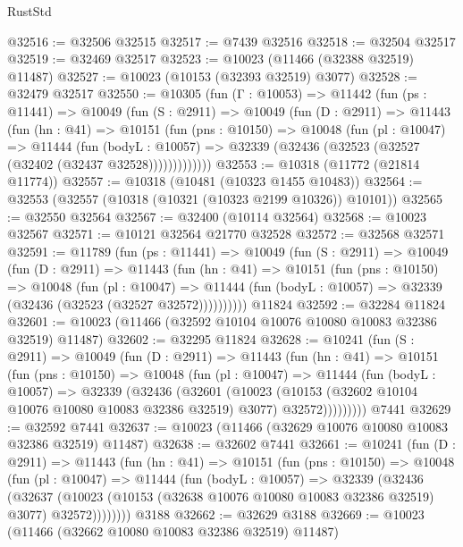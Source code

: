 \begin{lexlean}{RustStd}
\begin{coremodule}
@32516 := @32506 @32515
@32517 := @7439 @32516
@32518 := @32504 @32517
@32519 := @32469 @32517
@32523 := @10023 (@11466 (@32388 @32519) @11487)
@32527 := @10023 (@10153 (@32393 @32519) @3077)
@32528 := @32479 @32517
@32550 := @10305
    (fun (Γ : @10053) =>
    @11442
      (fun (ps : @11441) =>
      @10049
        (fun (S : @2911) =>
        @10049
          (fun (D : @2911) =>
          @11443
            (fun (hn : @41) =>
            @10151
              (fun (pns : @10150) =>
              @10048
                (fun (pl : @10047) =>
                @11444
                  (fun (bodyL : @10057) =>
                  @32339 (@32436 (@32523 (@32527 (@32402 (@32437 @32528)))))))))))))
@32553 := @10318 (@11772 (@21814 @11774))
@32557 := @10318 (@10481 (@10323 @1455 @10483))
@32564 := @32553 (@32557 (@10318 (@10321 (@10323 @2199 @10326)) @10101))
@32565 := @32550 @32564
@32567 := @32400 (@10114 @32564)
@32568 := @10023 @32567
@32571 := @10121 @32564 @21770 @32528
@32572 := @32568 @32571
@32591 := @11789
    (fun (ps : @11441) =>
    @10049
      (fun (S : @2911) =>
      @10049
        (fun (D : @2911) =>
        @11443
          (fun (hn : @41) =>
          @10151
            (fun (pns : @10150) =>
            @10048
              (fun (pl : @10047) =>
              @11444 (fun (bodyL : @10057) => @32339 (@32436 (@32523 (@32527 @32572))))))))))
    @11824
@32592 := @32284 @11824
@32601 := @10023 (@11466 (@32592 @10104 @10076 @10080 @10083 @32386 @32519) @11487)
@32602 := @32295 @11824
@32628 := @10241
    (fun (S : @2911) =>
    @10049
      (fun (D : @2911) =>
      @11443
        (fun (hn : @41) =>
        @10151
          (fun (pns : @10150) =>
          @10048
            (fun (pl : @10047) =>
            @11444
              (fun (bodyL : @10057) =>
              @32339
                (@32436
                  (@32601
                    (@10023
                      (@10153 (@32602 @10104 @10076 @10080 @10083 @32386 @32519) @3077)
                      @32572)))))))))
    @7441
@32629 := @32592 @7441
@32637 := @10023 (@11466 (@32629 @10076 @10080 @10083 @32386 @32519) @11487)
@32638 := @32602 @7441
@32661 := @10241
    (fun (D : @2911) =>
    @11443
      (fun (hn : @41) =>
      @10151
        (fun (pns : @10150) =>
        @10048
          (fun (pl : @10047) =>
          @11444
            (fun (bodyL : @10057) =>
            @32339
              (@32436
                (@32637
                  (@10023 (@10153 (@32638 @10076 @10080 @10083 @32386 @32519) @3077) @32572))))))))
    @3188
@32662 := @32629 @3188
@32669 := @10023 (@11466 (@32662 @10080 @10083 @32386 @32519) @11487)

\end{coremodule}
\end{lexlean}
